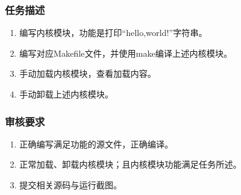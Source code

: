 \documentclass{article}
\begin{document}
\subsubsection{任务描述}
\begin{enumerate}
    \item 编写内核模块，功能是打印“hello,world!”字符串。
    \item 编写对应Makefile文件，并使用make编译上述内核模块。
    \item 手动加载内核模块，查看加载内容。
    \item 手动卸载上述内核模块。
\end{enumerate}
\subsubsection{审核要求}
\begin{enumerate}
    \item 正确编写满足功能的源文件，正确编译。
    \item 正常加载、卸载内核模块；且内核模块功能满足任务所述。
    \item 提交相关源码与运行截图。
\end{enumerate}
\end{document}
